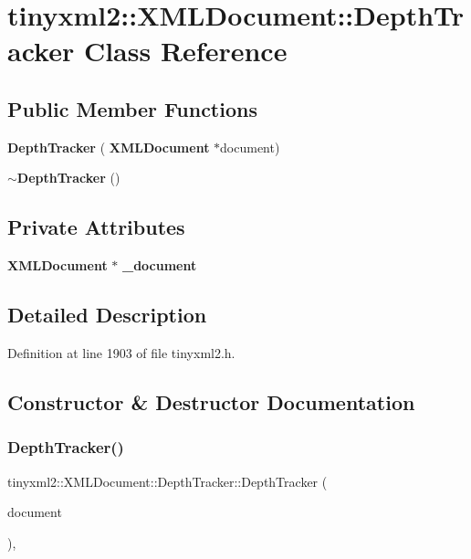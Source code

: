 \section{tinyxml2\+::X\+M\+L\+Document\+::Depth\+Tracker Class Reference}
\label{classtinyxml2_1_1_x_m_l_document_1_1_depth_tracker}
\subsection*{Public Member Functions}
\begin{DoxyCompactItemize}
\item 
\textbf{ Depth\+Tracker} (\textbf{ X\+M\+L\+Document} $\ast$document)
\item 
\textbf{ $\sim$\+Depth\+Tracker} ()
\end{DoxyCompactItemize}
\subsection*{Private Attributes}
\begin{DoxyCompactItemize}
\item 
\textbf{ X\+M\+L\+Document} $\ast$ \textbf{ \+\_\+document}
\end{DoxyCompactItemize}


\subsection{Detailed Description}


Definition at line 1903 of file tinyxml2.\+h.



\subsection{Constructor \& Destructor Documentation}
\mbox{\label{classtinyxml2_1_1_x_m_l_document_1_1_depth_tracker_ac2782a163c2da773b84cb2c610b79bcb}} 
\subsubsection{DepthTracker()}
{\footnotesize\ttfamily tinyxml2\+::\+X\+M\+L\+Document\+::\+Depth\+Tracker\+::\+Depth\+Tracker (\begin{DoxyParamCaption}\item[{\textbf{ X\+M\+L\+Document} $\ast$}]{document }\end{DoxyParamCaption})\hspace{0.3cm}{\ttfamily [inline]}, {\ttfamily [explicit]}}



